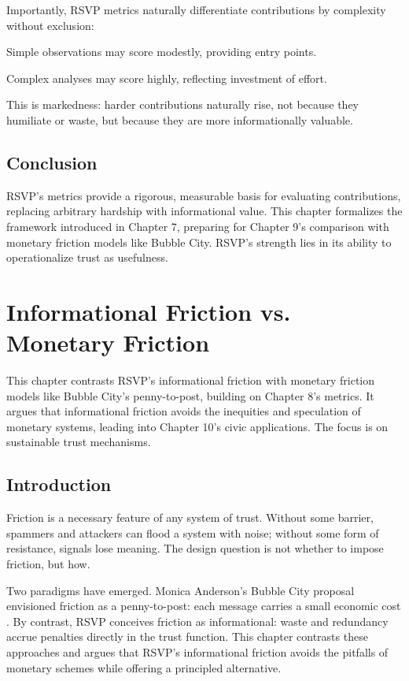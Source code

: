 \documentclass{book}
\begin{document}
Importantly, RSVP metrics naturally differentiate contributions by complexity without exclusion:

Simple observations may score modestly, providing entry points.

Complex analyses may score highly, reflecting investment of effort.

This is markedness: harder contributions naturally rise, not because they humiliate or waste, but because they are more informationally valuable.

\section{Conclusion}

RSVP’s metrics provide a rigorous, measurable basis for evaluating contributions, replacing arbitrary hardship with informational value. This chapter formalizes the framework introduced in Chapter 7, preparing for Chapter 9’s comparison with monetary friction models like Bubble City. RSVP’s strength lies in its ability to operationalize trust as usefulness.

\chapter{Informational Friction vs. Monetary Friction}

This chapter contrasts RSVP’s informational friction with monetary friction models like Bubble City’s penny-to-post, building on Chapter 8’s metrics. It argues that informational friction avoids the inequities and speculation of monetary systems, leading into Chapter 10’s civic applications. The focus is on sustainable trust mechanisms.

\section{Introduction}

Friction is a necessary feature of any system of trust. Without some barrier, spammers and attackers can flood a system with noise; without some form of resistance, signals lose meaning. The design question is not whether to impose friction, but how.

Two paradigms have emerged. Monica Anderson’s Bubble City proposal envisioned friction as a penny-to-post: each message carries a small economic cost \cite{anderson2022}. By contrast, RSVP conceives friction as informational: waste and redundancy accrue penalties directly in the trust function. This chapter contrasts these approaches and argues that RSVP’s informational friction avoids the pitfalls of monetary schemes while offering a principled alternative.
\end{document}
